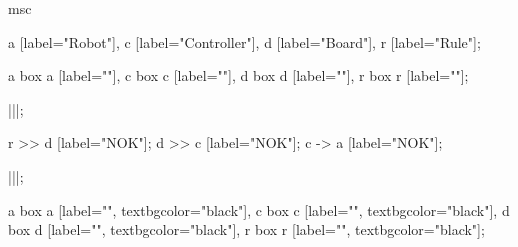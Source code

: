 \begin{msc}
msc
{

a [label="Robot"],
c [label="Controller"],
d [label="Board"],
r [label="Rule"];

a box a [label=""],
c box c [label=""],
d box d [label=""],
r box r [label=""];

|||;

r >> d [label="NOK"];
d >> c [label="NOK"];
c -> a [label="NOK"];

|||;

a box a [label="", textbgcolor="black"],
c box c [label="", textbgcolor="black"],
d box d [label="", textbgcolor="black"],
r box r [label="", textbgcolor="black"];

}
\end{msc}
